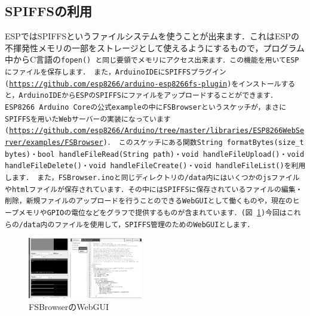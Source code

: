 \subsection{SPIFFSの利用}
ESPではSPIFFSというファイルシステムを使うことが出来ます．これはESPの不揮発性メモリの一部をストレージとして使えるようにするもので，プログラム中からC言語の\tt{fopen()}\rm{} と同じ要領でメモリにアクセス出来ます．この機能を用いてESPにファイルを保存します．
また，ArduinoIDEにSPIFFSプラグイン(\url{https://github.com/esp8266/arduino-esp8266fs-plugin})をインストールすると，ArduinoIDEからESPのSPIFFSにファイルをアップロードすることができます．
ESP8266 Arduino Coreの公式exampleの中にFSBrowserというスケッチが，まさにSPIFFSを用いたWebサーバーの実装になっています(\url{https://github.com/esp8266/Arduino/tree/master/libraries/ESP8266WebServer/examples/FSBrowser})．
このスケッチにある関数\tt{String formatBytes(size\_t bytes)}\rm{}・\tt{bool handleFileRead(String path)}\rm{}・\tt{void handleFileUpload()}\rm{}・\tt{void handleFileDelete()}\rm{}・\tt{void  handleFileCreate()}\rm{}・\tt{void  handleFileList()}\rm{}を利用します．
また，FSBrowser.inoと同じディレクトリの\tt{/data}\rm{}内にはいくつかのjsファイルやhtmlファイルが保存されています．その中にはSPIFFSに保存されているファイルの編集・削除，新規ファイルのアップロードを行うことのできるWebGUIとして働くものや，現在のヒープメモリやGPIOの電位などをグラフで提供するものが含まれています．(図 \ref{fig:fsb})今回はこれらの\tt{/data}\rm{}内のファイルを使用して，SPIFFS管理のためのWebGUIとします．

\begin{figure}[htbp]
    \centering
    \includegraphics[width=50mm]{./assets/haibaraaaaaaaasset/FSBrowser.png}
    \caption{FSBrowserのWebGUI}
    \label{fig:fsb}
\end{figure}

